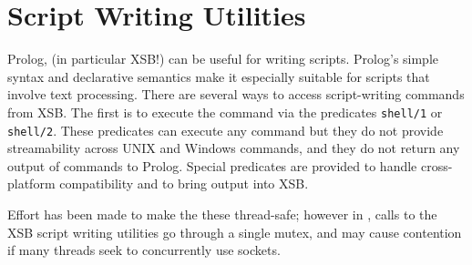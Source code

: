 \section{Script Writing Utilities}

Prolog, (in particular XSB!) can be useful for writing scripts.
Prolog's simple syntax and declarative semantics make it especially
suitable for scripts that involve text processing.  There are several
ways to access script-writing commands from XSB.  The first is to
execute the command via the predicates {\tt shell/1} or {\tt shell/2}.
These predicates can execute any command but they do not provide
streamability across UNIX and Windows commands, and they do not return
any output of commands to Prolog.  Special predicates are provided to
handle cross-platform compatibility and to bring output into XSB.

Effort has been made to make the these thread-safe; however in
\version, calls to the XSB script writing utilities go through a
single mutex, and may cause contention if many threads seek to
concurrently use sockets.

